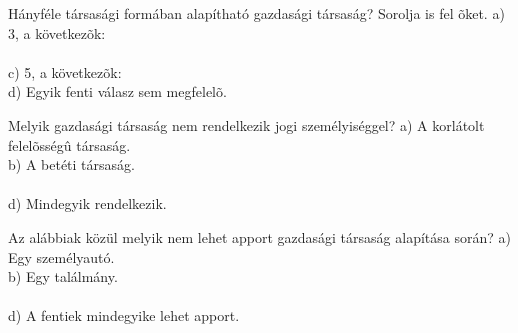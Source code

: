 \begin{frame}

\begin{tcolorbox}[title={67. Kérdés}]
Hányféle társasági formában alapítható gazdasági társaság? Sorolja is fel õket.
\tcblower
a) 3, a következõk:\\
\\
c) 5, a következõk:\\
d) Egyik fenti válasz sem megfelelõ.
\end{tcolorbox}

\begin{tcolorbox}[title={68. Kérdés}]
Melyik gazdasági társaság nem rendelkezik jogi személyiséggel?
\tcblower
a) A korlátolt felelõsségû társaság.\\
b) A betéti társaság.\\
\\
d) Mindegyik rendelkezik.
\end{tcolorbox}

\begin{tcolorbox}[title={69. Kérdés}]
Az alábbiak közül melyik nem lehet apport gazdasági társaság alapítása során?
\tcblower
a) Egy személyautó.\\
b) Egy találmány.\\
\\
d) A fentiek mindegyike lehet apport.
\end{tcolorbox}

\end{frame}


